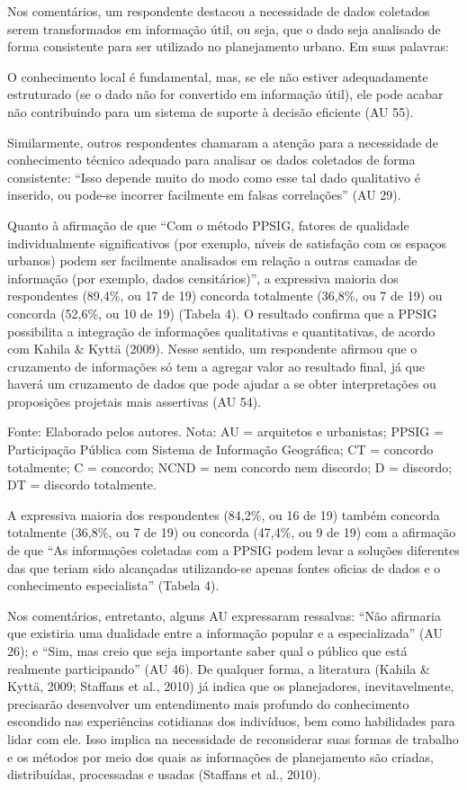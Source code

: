 \documentclass{article}
\begin{document}
Nos comentários, um respondente destacou a necessidade de dados coletados serem
transformados em informação útil, ou seja, que o dado seja analisado de forma
consistente para ser utilizado no planejamento urbano. Em suas palavras:

O conhecimento local é fundamental, mas, se ele não estiver adequadamente
estruturado (se o dado não for convertido em informação útil), ele pode
acabar não contribuindo para um sistema de suporte à decisão eficiente
(AU 55).

Similarmente, outros respondentes chamaram a atenção para a necessidade de
conhecimento técnico adequado para analisar os dados coletados de forma
consistente: “Isso depende muito do modo como esse tal dado qualitativo
é inserido, ou pode-se incorrer facilmente em falsas correlações”
(AU 29).

Quanto à afirmação de que “Com o método PPSIG, fatores de qualidade
individualmente significativos (por exemplo, níveis de satisfação com os
espaços urbanos) podem ser facilmente analisados em relação a outras camadas
de informação (por exemplo, dados censitários)”, a expressiva
maioria dos respondentes (89,4\%, ou 17 de 19) concorda totalmente (36,8\%, ou 7
de 19) ou concorda (52,6\%, ou 10 de 19) (Tabela
4). O resultado confirma que a PPSIG possibilita a integração de
informações qualitativas e quantitativas, de acordo com Kahila \& Kyttä (2009).
Nesse sentido, um respondente
afirmou que o cruzamento de informações só tem a agregar valor ao resultado
final, já que haverá um cruzamento de dados que pode ajudar a se obter
interpretações ou proposições projetais mais assertivas (AU 54).

Fonte: Elaborado pelos autores. Nota: AU = arquitetos e urbanistas;
PPSIG = Participação Pública com Sistema de Informação Geográfica;
CT = concordo totalmente; C = concordo; NCND = nem concordo nem
discordo; D = discordo; DT = discordo totalmente.

A expressiva maioria dos respondentes (84,2\%, ou 16 de 19) também concorda
totalmente (36,8\%, ou 7 de 19) ou concorda (47,4\%, ou 9 de 19) com a afirmação
de que “As informações coletadas com a PPSIG podem levar a soluções
diferentes das que teriam sido alcançadas utilizando-se apenas fontes
oficias de dados e o conhecimento especialista” (Tabela 4).

Nos comentários, entretanto, alguns AU expressaram ressalvas: “Não
afirmaria que existiria uma dualidade entre a informação popular e a
especializada” (AU 26); e “Sim, mas creio que seja
importante saber qual o público que está realmente participando”
(AU 46). De qualquer forma, a literatura (Kahila \& Kyttä, 2009; Staffans
et al., 2010) já indica que os planejadores, inevitavelmente,
precisarão desenvolver um entendimento mais profundo do conhecimento escondido
nas experiências cotidianas dos indivíduos, bem como habilidades para lidar com
ele. Isso implica na necessidade de reconsiderar suas formas de trabalho e os
métodos por meio dos quais as informações de planejamento são criadas,
distribuídas, processadas e usadas (Staffans et
al., 2010).
\end{document}
